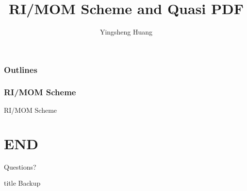 \documentclass[8pt,dvipsnames,table]{beamer}
\title{RI/MOM Scheme and Quasi PDF}
\author[Y. Huang]{Yingsheng Huang}
\institute[IHEP]{Institute of High Energy Physics}
\date
\begin{document}
\begin{frame}{}
	\maketitle
\end{frame}

\begin{frame}
	\frametitle{Outlines}
	\tableofcontents
\end{frame}

\begin{frame}
	\frametitle{RI/MOM Scheme}
	
	RI/MOM Scheme\citep{Martinelli:1994ty}

\end{frame}

{

}

\section*{END}
\begin{frame}[standout]
	\Huge Questions?
  \end{frame}

\appendix
\begin{frame}
	\vfill
	\centering
	\begin{beamercolorbox}[sep=8pt,center,shadow=true,rounded=true]{title}
		Backup\par%
	\end{beamercolorbox}
	\vfill
\end{frame}



\end{document}
